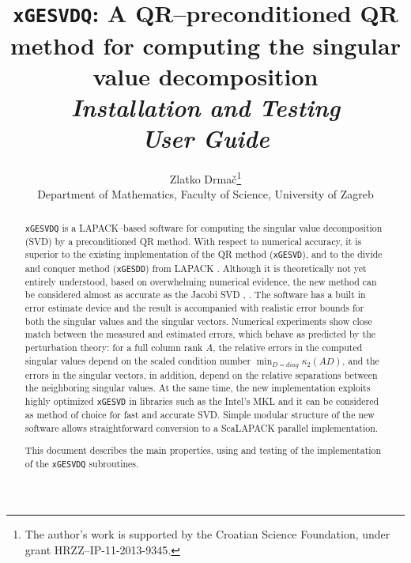 \documentclass[12pt, a4paper, final]{article}
\title{\texttt{xGESVDQ}: A QR--preconditioned QR  method for computing the singular value decomposition \\ \emph{Installation and Testing} \\  \emph{User Guide}}
\author{Zlatko  Drma\v{c}\thanks{The author's work is supported by the Croatian Science Foundation, under
		grant HRZZ--IP-11-2013-9345.} \\ Department of Mathematics, Faculty of Science, University of Zagreb}
\numberwithin{equation}{section}
\begin{document}
\maketitle
\begin{abstract}
	\texttt{xGESVDQ} \cite{drm-xgesvd-paper} is a LAPACK--based software for computing the
	singular value decomposition (SVD) by a preconditioned QR method. With respect to numerical accuracy, it is superior to the existing implementation of the QR method (\texttt{xGESVD}), and to the divide and conquer method (\texttt{xGESDD}) from LAPACK \cite{LAPACK}.
	Although it is theoretically not yet entirely understood, based on overwhelming numerical evidence, the new method can be considered almost as accurate as the Jacobi SVD \cite{dem-ves-92}, \cite{drm-ves-VW-1, drm-ves-VW-2}. The software has a built in error estimate device and the result is accompanied with realistic error bounds for both the singular values and the singular vectors. Numerical experiments show close match between the measured and estimated errors, which behave as predicted by the perturbation theory: for a full column rank $A$, the relative errors in the computed singular values depend on the scaled condition number $\min_{D=diag}\kappa_2(A D)$, and the errors in the singular vectors, in addition, depend on the relative separations between the neighboring singular values.  At the same time,  the new implementation exploits highly optimized \texttt{xGESVD} in libraries such as the Intel's MKL and it can be considered as method of choice for fast and accurate SVD. 
	Simple modular structure of the new software allows straightforward conversion to a ScaLAPACK parallel implementation.
	
	This document describes the main properties, using and testing of the implementation of the \texttt{xGESVDQ} subroutines.
\end{abstract}


\end{document}
